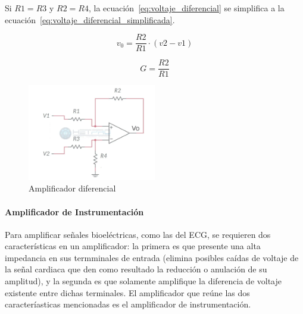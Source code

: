                 Si $R1 = R3$ y $R2 = R4$, la ecuación~\ref{eq:voltaje_diferencial} se simplifica a la ecuación~\ref{eq:voltaje_diferencial_simplificada}.

                \begin{equation}
                    \label{eq:voltaje_diferencial_simplificada}
                    v_0 = \frac{R2}{R1} \cdot (v2 - v1)
                \end{equation}

                \begin{equation}
                    \label{eq:ganancia_diferencial}
                    G = \frac{R2}{R1}
                \end{equation}

                \begin{figure}[H]
                    \centering
                    \includegraphics[width=0.5\textwidth]{img/Desarrollo/Amplificador_Diferencial.png}
                    \caption[Amplificador diferencial]{Amplificador diferencial\footnotemark}
                    \label{fig:Amplificador_Diferencial}
                \end{figure}

                \paragraph{Amplificador de Instrumentación}
                Para amplificar señales bioeléctricas, como las del ECG, se requieren dos características en un amplificador: la primera es que presente una alta impedancia en sus termminales de entrada (elimina posibles caídas de voltaje de la señal cardiaca que den como resultado la reducción o anulación de su amplitud), y la segunda es que solamente amplifique la diferencia de voltaje existente entre dichas terminales. 
                El amplificador que reúne las dos caracteríasticas mencionadas es el amplificador de instrumentación.

